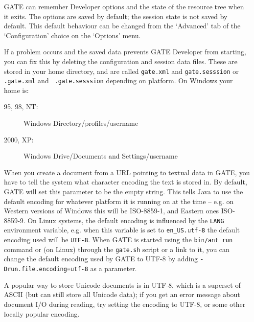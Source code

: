 

GATE can remember Developer options and the state of the resource tree when it
exits. The options are saved by default; the session state is not saved by
default. This default behaviour can be changed from the `Advanced' tab of
the `Configuration' choice on the `Options' menu.

If a problem occurs and the saved data prevents GATE Developer from
starting, you can fix this by deleting the configuration and session
data files. These are stored in your home directory, and are called
{\tt gate.xml} and {\tt gate.sesssion} or {\tt .gate.xml} and {\tt
.gate.sesssion} depending on platform.  On Windows your home is:
\begin{description}
\item[95, 98, NT:] Windows Directory/profiles/username
\item[2000, XP:] Windows Drive/Documents and Settings/username
\end{description}



When you create a document from a URL pointing to textual data
in GATE, you have to tell the system what character encoding the text is
stored in. By default, GATE will set this parameter to be the empty string.
This tells Java to use the default encoding for whatever platform it is
running on at the time -- e.g. on Western versions of Windows this will be
ISO-8859-1, and Eastern ones ISO-8859-9. On Linux systems, the default 
encoding is influenced by the \texttt{LANG} environment variable, e.g.
when this variable is set to \texttt{en\_US.utf-8} the default encoding used
will be \texttt{UTF-8}. When GATE is started using the \texttt{bin/ant run} 
command or (on Linux) through the \texttt{gate.sh} script or a link to it,
you can change the default encoding used by GATE to UTF-8 by adding 
\texttt{-Drun.file.encoding=utf-8} as a parameter.

A popular way to store Unicode
documents is in UTF-8, which is a superset of ASCII (but can still store all
Unicode data); if you get
an error message about document I/O during reading, try setting the encoding
to UTF-8, or some other locally popular encoding.

